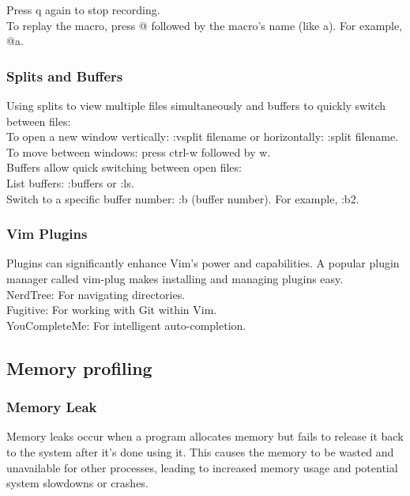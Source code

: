 \documentclass{article}
\begin{document}
Press q again to stop recording.\\

To replay the macro, press @ followed by the macro's name (like a). For example, @a.\\

\subsubsection{Splits and Buffers}
Using splits to view multiple files simultaneously and buffers to quickly switch between files:\\

To open a new window vertically: :vsplit filename or horizontally: :split filename.\\

To move between windows: press ctrl-w followed by w.\\

Buffers allow quick switching between open files:\\

List buffers: :buffers or :ls.\\

Switch to a specific buffer number: :b (buffer number). For example, :b2.\\

\subsubsection{Vim Plugins}
Plugins can significantly enhance Vim's power and capabilities. A popular plugin manager called vim-plug makes installing and managing plugins easy.\\

NerdTree: For navigating directories.\\

Fugitive: For working with Git within Vim.\\

YouCompleteMe: For intelligent auto-completion.\\

\subsection{Memory profiling}
\subsubsection{Memory Leak}
Memory leaks occur when a program allocates memory but fails to release it back to the system after it’s done using it. This causes the memory to be wasted and unavailable for other processes, leading to increased memory usage and potential system slowdowns or crashes.\\
\end{document}
